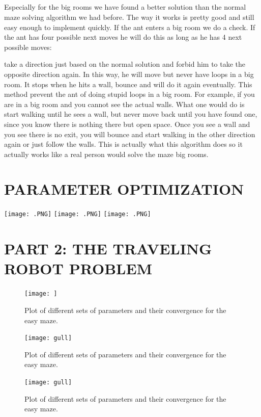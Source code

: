 \documentclass{scrartcl}
\begin{document}
\subsection{}
Especially for the big rooms we have found a better solution than the normal maze solving algorithm we had before. The way it works is pretty good and still easy enough to implement quickly. If the ant enters a big room we do a check. If the ant has four possible next moves he will do this as long as he has 4 next possible moves:\par
take a direction just based on the normal solution and forbid him to take the opposite direction again.
In this way, he will move but never have loops in a big room. It stops when he hits a wall, bounce and will do it again eventually. This method prevent the ant of doing stupid loops in a big room. For example, if you are in a big room and you cannot see the actual walls. What one would do is start walking until he sees a wall, but never move back until you have found one, since you know there is nothing there but open space. Once you see a wall and you see there is no exit, you will bounce and start walking in the other direction again or just follow the walls. This is actually what this algorithm does so it actually works like a real person would solve the maze big rooms.

\section{PARAMETER OPTIMIZATION}
\texttt{[image: .PNG]}
\texttt{[image: .PNG]}
\texttt{[image: .PNG]}
\pagebreak
\section{PART 2: THE TRAVELING ROBOT PROBLEM}

\begin{figure}[h!]
  \caption{Plot of different sets of parameters and their convergence for the easy maze.}
  \centering
    \texttt{[image: ]}
    \label{figure1}
\end{figure}

\begin{figure}[h!]
  \caption{Plot of different sets of parameters and their convergence for the easy maze.}
  \centering
    \texttt{[image: gull]}
    \label{fiure2}
\end{figure}

\begin{figure}[h!]
  \caption{Plot of different sets of parameters and their convergence for the easy maze.}
  \centering
    \texttt{[image: gull]}
    \label{figure3}
\end{figure}





 
 
 
 	
		 
		 
		
 
\end{document}
